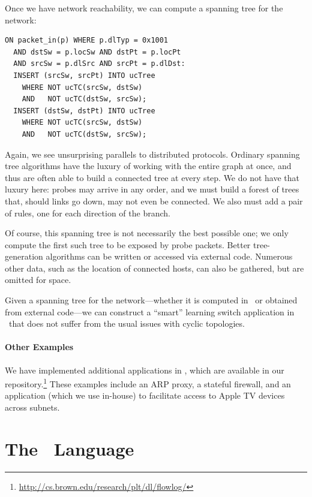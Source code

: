 Once we have network reachability, we can compute a spanning
tree for the network:
\begin{lstlisting}[label=list:12]   
ON packet_in(p) WHERE p.dlTyp = 0x1001
  AND dstSw = p.locSw AND dstPt = p.locPt
  AND srcSw = p.dlSrc AND srcPt = p.dlDst:
  INSERT (srcSw, srcPt) INTO ucTree 
    WHERE NOT ucTC(srcSw, dstSw)
    AND   NOT ucTC(dstSw, srcSw); 
  INSERT (dstSw, dstPt) INTO ucTree 
    WHERE NOT ucTC(srcSw, dstSw) 
    AND   NOT ucTC(dstSw, srcSw); 
\end{lstlisting}
Again, we see unsurprising parallels to distributed
protocols. Ordinary spanning tree algorithms have the luxury of working with the
entire graph at once, and thus are often able to build a connected tree at
every step. We do not have that luxury here: probes may arrive in any order,
and we must build a forest of trees that, should links go down, may not even
be connected. We also must add a pair of rules, one for each direction of the
branch.
 
Of course, this spanning tree is not necessarily the best possible one; we
only compute the first such tree to be exposed by probe packets. Better
tree-generation algorithms can be written or accessed via external code.
Numerous other data, such as the location of connected hosts, can also be
gathered, but are omitted for space.

Given a spanning tree for the network---whether it is computed in \flowlog\ or
obtained from external code---we can construct a ``smart'' learning switch
application in \flowlog\ that does not suffer from the usual issues with cyclic
topologies. 

\paragraph{Other Examples} We have implemented additional applications
in \flowlog, which are available in our repository.\footnote{\url{http://cs.brown.edu/research/plt/dl/flowlog/}} These
examples include an ARP proxy, a stateful firewall, and an application
(which we use in-house) to facilitate access to Apple TV devices across subnets.

\section{The \flowlog\ Language}
\label{sec:syntax}


